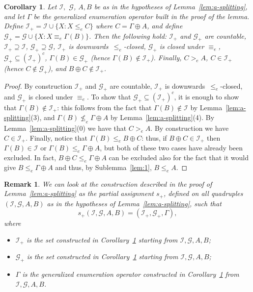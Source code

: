 \documentclass[11pt]{amsart}
\newtheorem{corollary}[theorem]{Corollary}
\newtheorem{rem}[theorem]{Remark}
\newenvironment{remark}{\begin{rem} \rm}{ \end{rem}}
\begin{document}
\begin{corollary}\label{cor:splitting1}
Let $\mathcal{I},$ $\mathcal{G}$, $A,B$ be as in the hypotheses of 
Lemma~\ref{lem:a-splitting}, and let $\Gamma$ be the generalized enumeration 
operator built in the proof of the lemma. Define $\mathcal{I}_+= \mathcal{I} 
\cup \{X: X \leq_e C\}$ where $C=\Gamma \oplus A$, and define $\mathcal{G}_+= 
\mathcal{G} \cup \{X: X \equiv_e \Gamma(B)\}$. Then the following hold: 
$\mathcal{I}_+$ and $\mathcal{G}_+$ are countable, $\mathcal{I}_+ \supseteq 
\mathcal{I}$, $\mathcal{G}_+ \supseteq \mathcal{G}$, $\mathcal{I}_+$ is 
downwards~$\leq_e$-closed, $\mathcal{G}_+$ is closed under $\equiv_e$,  
$\mathcal{G}_+ \subseteq (\mathcal{I}_+)^c$, $\Gamma(B) \in \mathcal{G}_+$ 
(hence $\Gamma(B) \notin \mathcal{I}_+$). Finally, $C  >_e A$, $C \in 
\mathcal{I}_+$ (hence $C \notin \mathcal{G}_+$), and $B\oplus C \notin  
\mathcal{I}_+$. 
\end{corollary}

\begin{proof}
By construction $\mathcal{I}_+$ and $\mathcal{G}_+$ are countable, 
$\mathcal{I}_+$ is downwards~$\leq_e$-closed, and $\mathcal{G}_+$ is closed 
under $\equiv_e$. To show that $\mathcal{G}_+ \subseteq (\mathcal{I}_+)^c$, it 
is enough to show that $\Gamma(B)\notin \mathcal{I}_+$: this follows from the 
fact that $\Gamma(B)\notin \mathcal{I}$ by Lemma~\ref{lem:a-splitting}(3), 
and $\Gamma(B) \nleq_e \Gamma \oplus A$ by Lemma~\ref{lem:a-splitting}(4). By 
Lemma~\ref{lem:a-splitting}(0) we have that $C >_e A$.  By construction we 
have $C \in \mathcal{I}_+$. Finally, notice that $\Gamma(B) \leq_e B\oplus 
C$: thus, if $B\oplus C \in  \mathcal{I}_+$ then $\Gamma(B)\in \mathcal{I}$ 
or $\Gamma(B)\leq_e \Gamma \oplus A$, but both of these two cases have
already been excluded. In fact, $B \oplus C \leq_e \Gamma \oplus A$ can be 
excluded also for the fact that it would give $B\leq_e \Gamma\oplus A$ and 
thus, by Sublemma~\ref{lem:1}, $B \leq_e A$. 
\end{proof} 

\begin{remark}\label{rem:can-look}
We can look at the construction described in the proof of 
Lemma~\ref{lem:a-splitting} as the partial assignment $s_+$, defined on all 
quadruples $(\mathcal{I}, \mathcal{G}, A, B)$ as in the hypotheses of 
Lemma~\ref{lem:a-splitting}, such that
\[
s_+(\mathcal{I}, \mathcal{G}, A, B)= (\mathcal{I}_+, \mathcal{G}_+,
\Gamma),
\] 
where
\begin{itemize}
  \item $\mathcal{I}_+$ is the set constructed in 
      Corollary~\ref{cor:splitting1} starting from $\mathcal{I}, 
      \mathcal{G}, A, B$; 
  \item $\mathcal{G}_+$ is the set constructed in 
      Corollary~\ref{cor:splitting1} starting from $\mathcal{I}, 
      \mathcal{G}, A, B$; 
  \item $\Gamma$ is the generalized enumeration operator constructed in 
      Corollary~\ref{cor:splitting1} from $\mathcal{I}, \mathcal{G}, A, B$. 
\end{itemize} 
\end{remark}
\end{document}
